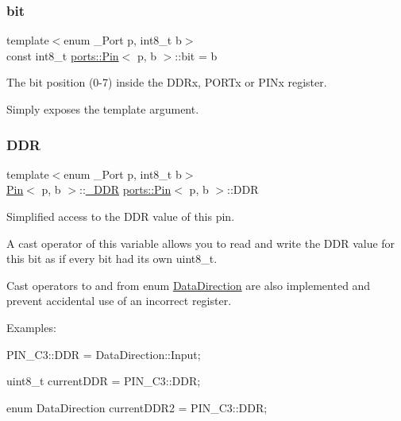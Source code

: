 \subsubsection{\texorpdfstring{bit}{bit}}
{\footnotesize\ttfamily template$<$enum \+\_\+\+Port p, int8\+\_\+t b$>$ \\
const int8\+\_\+t \hyperlink{structports_1_1Pin}{ports\+::\+Pin}$<$ p, b $>$\+::bit = b\hspace{0.3cm}{\ttfamily [static]}}



The bit position (0-\/7) inside the D\+D\+Rx, P\+O\+R\+Tx or P\+I\+Nx register. 

Simply exposes the template argument. \hypertarget{structports_1_1Pin_aaebb4d6cb5db0635fe8e7d6e7d315c7f}{}\label{structports_1_1Pin_aaebb4d6cb5db0635fe8e7d6e7d315c7f} 
\subsubsection{\texorpdfstring{D\+DR}{DDR}}
{\footnotesize\ttfamily template$<$enum \+\_\+\+Port p, int8\+\_\+t b$>$ \\
\hyperlink{structports_1_1Pin}{Pin}$<$ p, b $>$\+::\hyperlink{structports_1_1__Io}{\+\_\+\+D\+DR} \hyperlink{structports_1_1Pin}{ports\+::\+Pin}$<$ p, b $>$\+::D\+DR\hspace{0.3cm}{\ttfamily [static]}}



Simplified access to the D\+DR value of this pin. 

A cast operator of this variable allows you to read and write the D\+DR value for this bit as if every bit had its own {\ttfamily uint8\+\_\+t}.

Cast operators to and from enum \hyperlink{namespaceports_a46987e78fa447129742fadda5eccafb4}{Data\+Direction} are also implemented and prevent accidental use of an incorrect register.

Examples\+:


\begin{DoxyItemize}
\item {\ttfamily P\+I\+N\+\_\+\+C3\+::\+D\+DR = Data\+Direction\+::\+Input;}
\item {\ttfamily uint8\+\_\+t current\+D\+DR = P\+I\+N\+\_\+\+C3\+::\+D\+DR;}
\item {\ttfamily enum Data\+Direction current\+D\+D\+R2 = P\+I\+N\+\_\+\+C3\+::\+D\+DR;} 
\end{DoxyItemize}\hypertarget{structports_1_1Pin_ae2e45a41082457c350f71f7a720265d4}{}\label{structports_1_1Pin_ae2e45a41082457c350f71f7a720265d4} 
